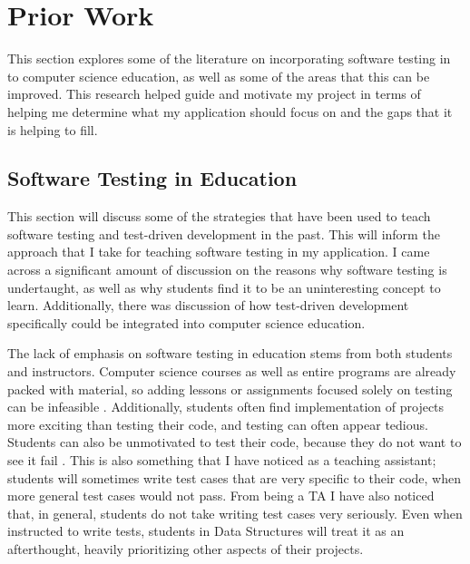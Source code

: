 \documentclass[10pt,twocolumn]{article}
\begin{document}
\section{Prior Work}

This section explores some of the literature on incorporating software testing in to computer science education, as well 
as some of the areas that this can be improved. This research helped guide and motivate my project in terms of helping me 
determine what my application should focus on and the gaps that it is helping to fill.



\subsection{Software Testing in Education} 


This section will discuss some of the strategies that have been used to teach software testing and test-driven 
development in the past. This will inform the approach that I take for teaching software testing in my application. 
I came across a significant amount of discussion on the reasons why software testing is undertaught, as well as why 
students find it to be an uninteresting concept to learn. Additionally, there was discussion of how test-driven 
development specifically could be integrated into computer science education. 

The lack of emphasis on software testing in education stems from both students and instructors. Computer science courses 
as well as entire programs are already packed with material, so adding lessons or assignments focused solely on testing 
can be infeasible \cite{Edwards2003Article2}. Additionally, students often find implementation of projects more exciting 
than testing their code, and testing can often appear tedious. Students can also be unmotivated to 
test their code, because they do not want to see it fail \cite{Carrington1997Article}. This is also something that I 
have noticed as a teaching assistant; students will sometimes write test cases that are very specific to their code, 
when more general test cases would not pass. From being a TA I have also noticed that, in general, students do not take 
writing test cases very seriously. Even when instructed to write tests, students in Data Structures will treat it as an 
afterthought, heavily prioritizing other aspects of their projects. 
\end{document}
